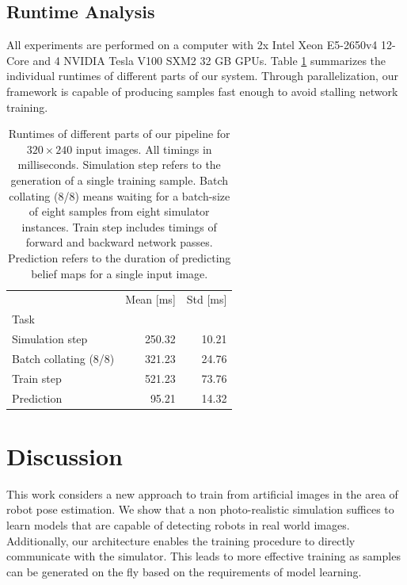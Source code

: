 \documentclass[conference]{IEEEtran}
\begin{document}
    \subsection{Runtime Analysis}
    All experiments are performed on a computer with 2x Intel Xeon E5-2650v4 12-Core and 4 NVIDIA Tesla V100 SXM2 32 GB GPUs. Table \ref{tab:runtime} summarizes the individual runtimes of different parts of our system. Through parallelization, our framework is capable of producing samples fast enough to avoid stalling network training.

    \begin{table}
        \centering
        \begin{tabular}{lrr}
            \toprule
            {} &  Mean [ms] &  Std [ms] \\
            Task                   &            &           \\
            \midrule
            Simulation step        &      250.32 &    10.21  \\
            Batch collating (8/8)  &      321.23 &    24.76  \\
            Train step             &      521.23 &   73.76  \\
            Prediction             &      95.21 &    14.32 \\
            \bottomrule
        \end{tabular}
        \caption{
            \label{tab:runtime} 
            Runtimes of different parts of our pipeline for $320 \times 240$ input images. All timings in milliseconds. Simulation step refers to the generation of a single training sample. Batch collating (8/8) means waiting for a batch-size of eight samples from eight simulator instances. Train step includes timings of forward and backward network passes. Prediction refers to the duration of predicting belief maps for a single input image.
        }
    \end{table}

\section{Discussion}
This work considers a new approach to train from artificial images in the area of robot pose estimation. We show that a non photo-realistic simulation suffices to learn models that are capable of detecting robots in real world images. Additionally, our architecture enables the training procedure to directly communicate with the simulator. This leads to more effective training as samples can be generated on the fly based on the requirements of model learning.
\end{document}
